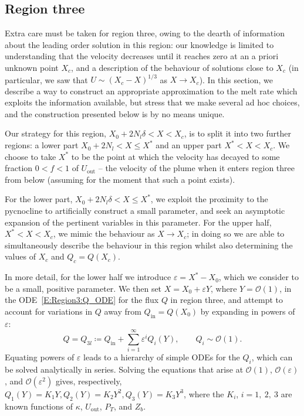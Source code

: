 \documentclass[openacc]{rsproca_new}%
\newcommand{\order}[1]{\mathcal{O}(#1)}
\newcommand{\lt}{\delta} %
\renewcommand{\in}{\text{in}} %
\newcommand{\out}{\text{out}}
\begin{document}
\subsection{Region three}\label{S:MeltRate:R3}
Extra care must be taken for region three, owing to the dearth of information about the leading order solution in this region: our knowledge is limited to understanding that the velocity decreases until it reaches zero at an a priori unknown point $X_c$, and a description of the behaviour of solutions close to $X_c$ (in particular, we saw that $U \sim (X_c - X)^{1/3}$ as $X \to X_c$). In this section, we describe a way to construct an appropriate approximation to the melt rate which exploits the information available, but stress that we make several ad hoc choices, and the construction presented below is by no means unique.

Our strategy for this region, $X_0 + 2N_l \lt < X < X_c$, is to split it into two further regions: a lower part $X_0 + 2 N_l < X \leq X^*$ and an upper part $X^* < X < X_c$. We choose to take $X^*$ to be the point at which the velocity has decayed to some fraction $0 < f < 1$ of $U_\out$ -- the velocity of the plume when it enters region three from below (assuming for the moment that such a point exists).

For the lower part, $X_0  + 2N_l \lt < X \leq X^*$, we exploit the proximity to the pycnocline to artificially construct a small parameter, and seek an asymptotic expansion of the pertinent variables in this parameter. For the upper half, $X^* < X < X_c$, we mimic the behaviour as $X \to X_c$; in doing so we are able to simultaneously describe the behaviour in this region whilst also determining the values of $X_c$ and $Q_c = Q(X_c)$.

In more detail, for the lower half we introduce $\varepsilon = X^* - X_0$,
which we consider to be a small, positive parameter. We then set $X = X_0 + \varepsilon Y$, where  $Y = \order{1}$, in the ODE~\eqref{E:Region3:Q_ODE} for the flux $Q$ in region three, and attempt to account for variations in $Q$ away from $Q_{\text{in}} = Q(X_0)$ by expanding in powers of $\varepsilon$:
\begin{equation}\label{E:MeltRate:Q_expansionR3}
Q = Q_{3l} \coloneqq   Q_\in  + \sum_{i = 1}^{\infty} \varepsilon^i Q_i(Y), \qquad Q_i \sim \order{1}.
 \end{equation}
Equating powers of $\varepsilon$ leads to a hierarchy of simple ODEs for the $Q_i$, which can be solved analytically in series. Solving the equations that arise at $\order{1}$, $\order{\varepsilon}$, and $\order{\varepsilon^2}$ gives, respectively, $
Q_1(Y) = K_1 Y,  Q_2(Y) = K_2 Y^2,  Q_3(Y) =K_3 Y^3$, where the $K_i$, $i = 1,~2,~3$ are known functions of $\kappa$, $U_{\text{out}}$, $P_T$, and $Z_b$.
\end{document}
